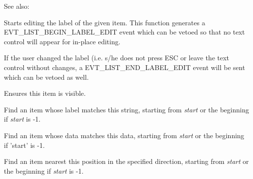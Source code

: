 See also: 


\label{wxlistctrledit}


Starts editing the label of the given item. This function generates a
EVT\_LIST\_BEGIN\_LABEL\_EDIT event which can be vetoed so that no
text control will appear for in-place editing.

If the user changed the label (i.e. s/he does not press ESC or leave
the text control without changes, a EVT\_LIST\_END\_LABEL\_EDIT event
will be sent which can be vetoed as well.


\label{wxlistctrlensurevisible}


Ensures this item is visible.


\label{wxlistctrlfinditem}


Find an item whose label matches this string, starting from {\it start} or
the beginning if {\it start} is -1.


Find an item whose data matches this data, starting from {\it start} or
the beginning if 'start' is -1.


Find an item nearest this position in the specified direction, starting from
{\it start} or the beginning if {\it start} is -1.




